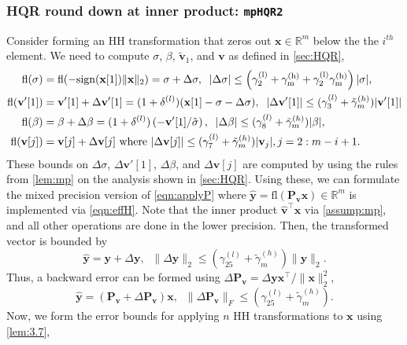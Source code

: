 \documentclass[review,onefignum,onetabnum]{siamart190516}
\newcommand{\R}{\mathbb{R}}
\newcommand{\dd}{\delta}
\newcommand{\bb}[1]{\mathbf{#1}}
\newcommand{\fl}{\mathrm{fl}}
\begin{document}
\subsubsection{HQR round down at inner product: {\tt mpHQR2}}
Consider forming an HH transformation that zeros out $\bb{x}\in\R^m$ below the the $i^{th}$ element. 
We need to compute $\sigma$, $\beta$, $\tilde{\bb{v}}_1$, and $\bb{v}$ as defined in \cref{sec:HQR},
\begin{align}
\fl(\sigma) &= \fl(-\rm{sign}(\bb{x}[1])\|\bb{x}\|_2) = \sigma + \Delta \sigma,\;\;|\Delta\sigma| \leq \left(\gamma_{2}^{(l)}+\gamma_{m}^{(h)}+\gamma_{2}^{(l)}\gamma_{m}^{(h)}\right)|\sigma|,\label{eqn:mpsigma}\\
\fl(\bb{v}'[1])& =\bb{v}'[1] + \Delta \bb{v}'[1] = (1+\dd^{(l)}) (\bb{x}[1]-\sigma-\Delta\sigma), \;\;|\Delta\bb{v}'[1]| \leq (\gamma_{3}^{(l)}+\tilde{\gamma}_{m}^{(h)})|\bb{v}'[1]| \label{eqn:mpv1}\\
\fl(\beta) &= \beta +\Delta \beta= (1+\dd^{(l)})\left(-\bb{v}'[1]/\hat{\sigma}\right), \;\; |\Delta\beta| \leq (\gamma_{8}^{(l)}+\tilde{\gamma}_{m}^{(h)})|\beta|, \label{eqn:mpbeta}\\
	\fl(\bb{v}[j])	&= \bb{v}[j] + \Delta \bb{v}[j]\text{ where }|\Delta \bb{v}[j]|\leq 
	(\gamma_{7}^{(l)} + \tilde{\gamma}_{m}^{(h)})|\bb{v}_j|,j=2:m-i+1 \label{eqn:mpv}. 
\end{align}
These bounds on $\Delta\sigma$, $\Delta \bb{v}'[1]$, $\Delta \beta$, and $\Delta \bb{v}[j]$ are computed by using the rules from \cref{lem:mp} on the analysis shown in \cref{sec:HQR}.
Using these, we can formulate the mixed precision version of \cref{eqn:applyP} where $\hat{\bb{y}}=\fl(\bb{P_vx})\in\R^m$ is implemented via \cref{eqn:effH}.
Note that the inner product $\hat{\bb{v}}^{\top}\bb{x}$ via \cref{assump:mp}, and all other operations are done in the lower precision.
Then, the transformed vector is bounded by
\begin{equation}
	\hat{\bb{y}} = \bb{y}+\Delta \bb{y},\;\; \|\Delta \bb{y}\|_2 \leq (\gamma_{25}^{(l)} + \tilde{\gamma}_{m}^{(h)})\|\bb{y}\|_2.\label{eqn:mpdelty}
\end{equation}
Thus, a backward error can be formed using $\Delta \bb{P_v} = \Delta \bb{y}\bb{x}^{
\top}/\|\bb{x}\|_2^2$,
\begin{equation}
	\hat{\bb{y}} = (\bb{P_v} + \Delta \bb{P_v})\bb{x},\;\; \|\Delta \bb{P_v}\|_F\leq (\gamma_{25}^{(l)} + \tilde{\gamma}_{m}^{(h)}). \label{eqn:mpapplyP}
\end{equation}
Now, we form the error bounds for applying $n$ HH transformations to $\bb{x}$ using \cref{lem:3.7},
\end{document}
